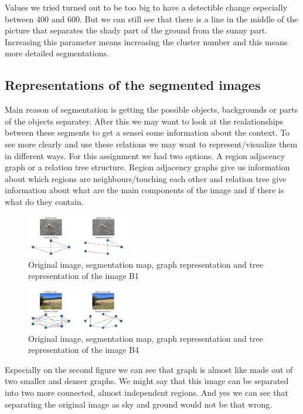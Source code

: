 \documentclass[conference]{IEEEtran}
\begin{document}
Values we tried turned out to be too big to have a detectible change especially between 400 and 600. But we can still see that there is a line in the middle of the picture that separates the shady part of the ground from the sunny part. Increasing this parameter means increasing the cluster number and this means more detailed segmentations.

\subsection{Representations of the segmented images}
Main reason of segmentation is getting the possible objects, backgrounds or parts of the objects separatey.  After this we may want to look at the realationships between these segments to get a sensei some information about the context. To see more clearly and use these relations we may want to represent/visualize them in different ways. For this assignment we had two options. A region adjacency graph or a relation tree structure. Region adjacency graphs give us information about which regions are neighbours/touching each other and relation tree give information about what are the main components of the image and if there is what do they contain.

\begin{figure}[h]
        \centering
        \includegraphics[width=0.4\textwidth]{resources/r_1.png}
        \caption{Original image, segmentation map, graph representation and tree representation of the image B1}
        \label{fig:r_1}
    \end{figure}

\begin{figure}[h]
        \centering 
        \includegraphics[width=0.4\textwidth]{resources/r_2.png}
        \caption{Original image, segmentation map, graph representation and tree representation of the image B4}
        \label{fig:r_2}
    \end{figure}

Especially on the second figure we can see that graph is almost like made out of two smaller and denser graphs. We might say that this image can be separated into two more connected, almost independent regions. 
And yes we can see that separating the original image as sky and ground would not be that wrong. 
\end{document}
